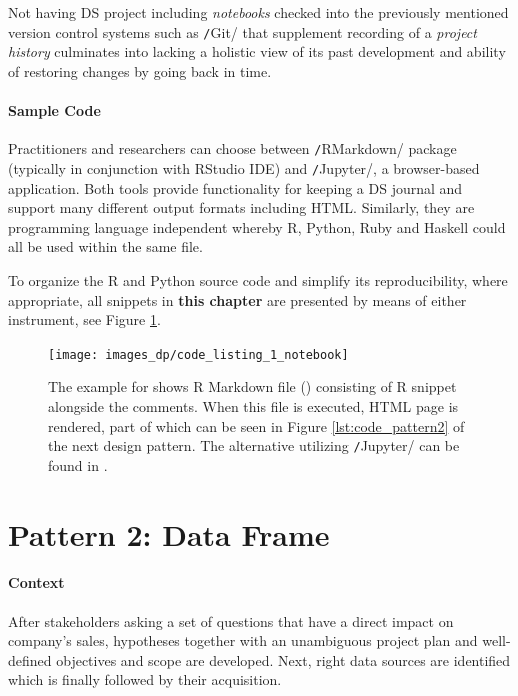 Not having \ac{DS} project including \emph{notebooks} checked into the previously mentioned version control systems such as \texttt/Git/ that supplement recording of a \emph{project history} culminates into lacking a holistic view of its past development and ability of restoring changes by going back in time. 

\paragraph*{Sample Code}
Practitioners and researchers can choose between \texttt/RMarkdown/ package (typically in conjunction with RStudio \ac{IDE}) and \texttt/Jupyter/, a browser-based application. 
Both tools provide functionality for keeping a \ac{DS} journal and support many different output formats including \ac{HTML}. 
Similarly, they are programming language independent whereby R, Python, Ruby and Haskell could all be used within the same file. 

To organize the R and Python source code and simplify its reproducibility, where appropriate, all snippets in \textbf{this chapter} are presented by means of either instrument, see Figure \ref{lst:code_pattern1}.

\begin{figure}[!ht]
\centering
\texttt{[image: images\_dp/code\_listing\_1\_notebook]}
\caption[Example for Notebook Design Pattern.]{The example for  shows R Markdown file () consisting of R snippet alongside the comments. 
When this file is executed, \ac{HTML} page is rendered, part of which can be seen in Figure \ref{lst:code_pattern2} of the next design pattern.
The alternative utilizing \texttt/Jupyter/ can be found in .}
\label{lst:code_pattern1}
\end{figure}

\section{Pattern 2: Data Frame}

\paragraph*{Context}
After stakeholders asking a set of questions that have a direct impact on company's sales, hypotheses together with an unambiguous project plan and well-defined objectives and scope are developed. 
Next, right data sources are identified which is finally followed by their acquisition.


